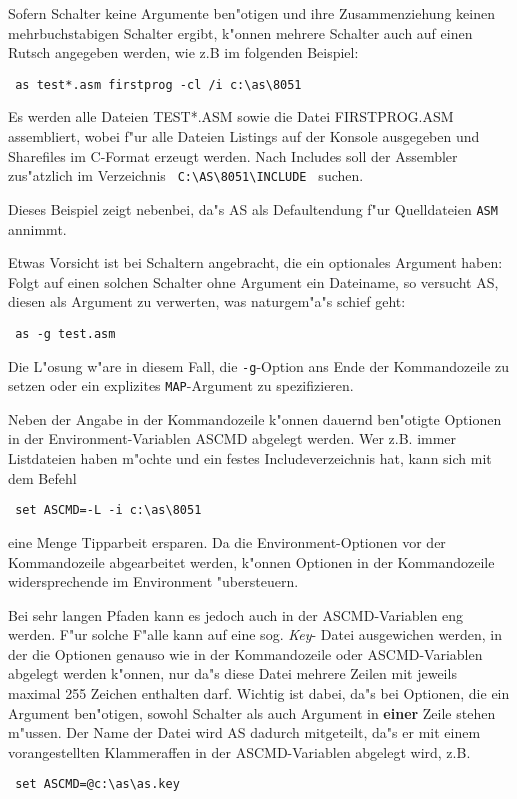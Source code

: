 \documentclass[12pt,a4paper,twoside]{report}
\newcommand{\ii}[1]{{\it #1}}
\newcommand{\bb}[1]{{\bf #1}}
\newcommand{\tty}[1]{{\tt #1}}
\begin{document}
Sofern Schalter keine Argumente ben"otigen und ihre Zusammenziehung
keinen mehrbuchstabigen Schalter ergibt, k"onnen mehrere Schalter
auch auf einen Rutsch angegeben werden, wie z.B im folgenden Beispiel:
\begin{verbatim}
 as test*.asm firstprog -cl /i c:\as\8051
\end{verbatim}
Es werden alle Dateien TEST*.ASM sowie die Datei FIRSTPROG.ASM
assembliert, wobei f"ur alle Dateien Listings auf der Konsole
ausgegeben und Sharefiles im C-Format erzeugt werden.  Nach Includes
soll der Assembler zus"atzlich im Verzeichnis \verb! C:\AS\8051\INCLUDE !
suchen.
\par
Dieses Beispiel zeigt nebenbei, da"s AS als Defaultendung f"ur Quelldateien
\tty{ASM} annimmt.
\par
Etwas Vorsicht ist bei Schaltern angebracht, die ein optionales Argument
haben: Folgt auf einen solchen Schalter ohne Argument ein Dateiname, so
versucht AS, diesen als Argument zu verwerten, was naturgem"a"s schief
geht:
\begin{verbatim}
 as -g test.asm
\end{verbatim}
Die L"osung w"are in diesem Fall, die \tty{-g}-Option ans Ende der
Kommandozeile zu setzen oder ein explizites \tty{MAP}-Argument zu
spezifizieren.
\par
Neben der Angabe in der Kommandozeile k"onnen dauernd ben"otigte
Optionen in der Environment-Variablen ASCMD abgelegt werden. Wer z.B.
immer Listdateien haben m"ochte und ein festes Includeverzeichnis hat,
kann sich mit dem Befehl
\begin{verbatim}
 set ASCMD=-L -i c:\as\8051
\end{verbatim}
eine Menge Tipparbeit ersparen.  Da die Environment-Optionen vor der
Kommandozeile abgearbeitet werden, k"onnen Optionen in der
Kommandozeile widersprechende im Environment "ubersteuern.
\par
Bei sehr langen Pfaden kann es jedoch auch in der ASCMD-Variablen eng
werden.  F"ur solche F"alle kann auf eine sog. \ii{Key}- Datei
ausgewichen werden, in der die Optionen genauso wie in der Kommandozeile
oder ASCMD-Variablen abgelegt werden k"onnen, nur da"s diese Datei
mehrere Zeilen mit jeweils maximal 255 Zeichen enthalten darf.  Wichtig
ist dabei, da"s bei Optionen, die ein Argument ben"otigen, sowohl Schalter
als auch Argument in \bb{einer} Zeile stehen m"ussen.  Der Name der
Datei wird AS dadurch mitgeteilt, da"s er mit einem vorangestellten
Klammeraffen in der ASCMD-Variablen abgelegt wird, z.B.
\begin{verbatim}
 set ASCMD=@c:\as\as.key
\end{verbatim}
\end{document}
